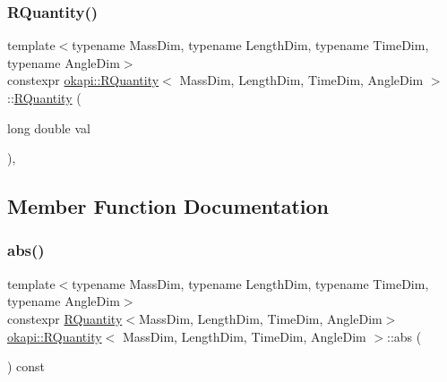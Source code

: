 \mbox{\label{classokapi_1_1RQuantity_ab9101b75104aaa2a367781b4b0160c50}} 
\subsubsection{\texorpdfstring{RQuantity()}{RQuantity()}\hspace{0.1cm}{\footnotesize\ttfamily [3/3]}}
{\footnotesize\ttfamily template$<$typename Mass\+Dim, typename Length\+Dim, typename Time\+Dim, typename Angle\+Dim$>$ \\
constexpr \mbox{\hyperlink{classokapi_1_1RQuantity}{okapi\+::\+R\+Quantity}}$<$ Mass\+Dim, Length\+Dim, Time\+Dim, Angle\+Dim $>$\+::\mbox{\hyperlink{classokapi_1_1RQuantity}{R\+Quantity}} (\begin{DoxyParamCaption}\item[{long double}]{val }\end{DoxyParamCaption})\hspace{0.3cm}{\ttfamily [inline]}, {\ttfamily [explicit]}}



\subsection{Member Function Documentation}
\mbox{\label{classokapi_1_1RQuantity_a6c2615772058175dec0223d662c04b29}} 
\subsubsection{\texorpdfstring{abs()}{abs()}}
{\footnotesize\ttfamily template$<$typename Mass\+Dim, typename Length\+Dim, typename Time\+Dim, typename Angle\+Dim$>$ \\
constexpr \mbox{\hyperlink{classokapi_1_1RQuantity}{R\+Quantity}}$<$Mass\+Dim, Length\+Dim, Time\+Dim, Angle\+Dim$>$ \mbox{\hyperlink{classokapi_1_1RQuantity}{okapi\+::\+R\+Quantity}}$<$ Mass\+Dim, Length\+Dim, Time\+Dim, Angle\+Dim $>$\+::abs (\begin{DoxyParamCaption}{ }\end{DoxyParamCaption}) const\hspace{0.3cm}{\ttfamily [inline]}}


